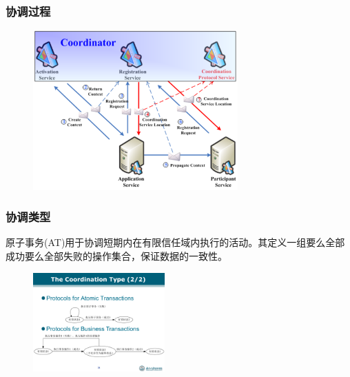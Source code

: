 \subsubsection{协调过程}
\begin{figure}[H]
    \vspace{-0.5em}
	\centering
	\includegraphics[width=0.7\textwidth]{images/协调过程.png}
    \vspace{-1.5em}
\end{figure}

\subsubsection{协调类型}
原子事务(AT)用于协调短期内在有限信任域内执行的活动。其定义一组要么全部成功要么全部失败的操作集合，保证数据的一致性。
\begin{figure}[H]
    \vspace{-0.5em}
	\centering
	\includegraphics[width=0.45\textwidth]{images/WSAT.pdf}
    \vspace{-1.5em}
\end{figure}

